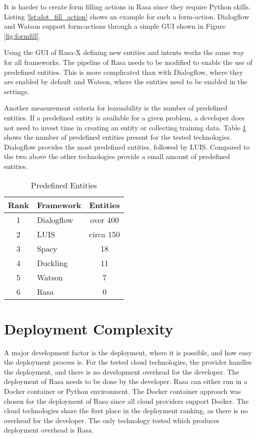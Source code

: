 It is harder to create form filling actions in Rasa since they require Python skills.
Listing \ref{lst:slot_fill_action} shows an example for such a form-action.
Dialogflow and Watson support form-actions through a simple GUI shown in Figure \ref{fig:formfill}.

Using the GUI of Rasa-X defining new entities and intents works the same way for all frameworks.
The pipeline of Rasa needs to be modified to enable the use of predefined entities.
This is more complicated than with Dialogflow, where they are enabled by default and Watson, where the entities need to be enabled in the settings.

Another measurement criteria for learnability is the number of predefined entities.
If a predefined entity is available for a given problem, a developer does not need to invest time in creating an entity or collecting training data. 
Table \ref{tab:predefined_entities} shows the number of predefined entities present for the tested technologies.
Dialogflow provides the most predefined entities, followed by LUIS.
Compared to the two above the other technologies provide a small amount of predefined entities.
\begin{table}[H]
    \centering
    \begin{tabular}{ c | l | c }
        Rank & Framework &  Entities \\ \hline \hline
        1 & \multirow{1}{*}{Dialogflow} & over 400 \\
        2 & \multirow{1}{*}{LUIS} & circa 150 \\
        3 & \multirow{1}{*}{Spacy} & 18 \\
        4 & \multirow{1}{*}{Duckling} & 11 \\
        5 & \multirow{1}{*}{Watson} & 7  \\
        6 & \multirow{1}{*}{Rasa} & 0 \\
    \end{tabular}
    \caption{Predefined Entities} \label{tab:predefined_entities}
\end{table} \noindent

\section*{Deployment Complexity}
A major development factor is the deployment, where it is possible, and how easy the deployment process is.
For the tested cloud technologies, the provider handles the deployment, and there is no development overhead for the developer.
The deployment of Rasa needs to be done by the developer.
Rasa can either run in a Docker container or Python environment.
The Docker container approach was chosen for the deployment of Rasa since all cloud providers support Docker.
The cloud technologies share the first place in the deployment ranking, as there is no overhead for the developer.
The only technology tested which produces deployment overhead is Rasa. 


